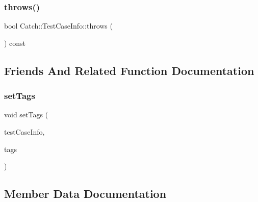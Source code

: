 \hypertarget{struct_catch_1_1_test_case_info_afc70d4379a2070cc22b693ffe3932c1a}{}\label{struct_catch_1_1_test_case_info_afc70d4379a2070cc22b693ffe3932c1a} 
\subsubsection{\texorpdfstring{throws()}{throws()}}
{\footnotesize\ttfamily bool Catch\+::\+Test\+Case\+Info\+::throws (\begin{DoxyParamCaption}{ }\end{DoxyParamCaption}) const}



\subsection{Friends And Related Function Documentation}
\hypertarget{struct_catch_1_1_test_case_info_addc10c770e56f49da5baa0c76cf25bd5}{}\label{struct_catch_1_1_test_case_info_addc10c770e56f49da5baa0c76cf25bd5} 
\subsubsection{\texorpdfstring{set\+Tags}{setTags}}
{\footnotesize\ttfamily void set\+Tags (\begin{DoxyParamCaption}\item[{\hyperlink{struct_catch_1_1_test_case_info}{Test\+Case\+Info} \&}]{test\+Case\+Info,  }\item[{std\+::set$<$ std\+::string $>$ const \&}]{tags }\end{DoxyParamCaption})\hspace{0.3cm}{\ttfamily [friend]}}



\subsection{Member Data Documentation}
\hypertarget{struct_catch_1_1_test_case_info_a1a5e0825132a38d091defdebbf2f8ce9}{}\label{struct_catch_1_1_test_case_info_a1a5e0825132a38d091defdebbf2f8ce9} 
